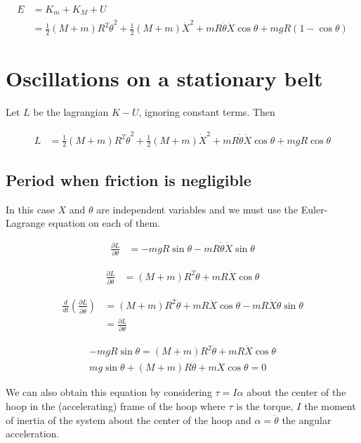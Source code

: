 \documentclass{article}
\newcommand{\half}{\frac{1}{2}}
\begin{document}
\begin{align*}
E &= K_m + K_M + U \\
&= \half (M+m) R^2 \dot{\theta}^2 + \half (M+m) \dot{X}^2 + mR\dot\theta \dot X\cos\theta + mgR(1 - \cos\theta)
\end{align*}

\section{Oscillations on a stationary belt}

Let $L$ be the lagrangian $K - U$, ignoring constant terms. Then

\begin{align*}
L &= \half (M+m) R^2 \dot{\theta}^2 + \half (M+m) \dot{X}^2 + mR\dot\theta \dot X\cos\theta + mgR\cos\theta
\end{align*}

\subsection{Period when friction is negligible}

In this case $X$ and $\theta$ are independent variables and we must use the Euler-Lagrange equation on each of them.

\begin{align*}
\frac{\partial L}{\partial \theta} &= -mgR\sin\theta - mR\dot\theta\dot X \sin\theta
\end{align*}

\begin{align*}
\frac{\partial L}{\partial \dot\theta} &= (M+m) R^2 \dot{\theta} + mR \dot X\cos\theta
\end{align*}

\begin{align*}
\frac{d}{dt}\left(\frac{\partial L}{\partial \dot\theta}\right) &= (M+m) R^2 \ddot\theta + mR \ddot X\cos\theta - mR\dot X \dot\theta\sin\theta \\
&= \frac{\partial L}{\partial \theta}
\end{align*}

\begin{align*}
-mgR\sin\theta = (M+m) R^2 \ddot\theta + mR \ddot X\cos\theta \\
mg\sin\theta + (M+m) R \ddot{\theta} + m \ddot X\cos\theta = 0
\end{align*}

We can also obtain this equation by considering $\tau = I\alpha$ about the center of the hoop in the (accelerating) frame of the hoop where $\tau$ is the torque, $I$ the moment of inertia of the system about the center of the hoop and $\alpha = \ddot\theta$ the angular acceleration.
\end{document}
